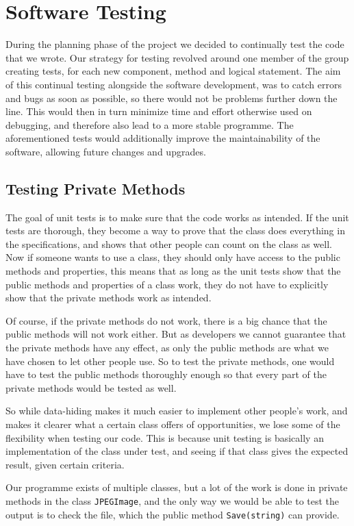 \section{Software Testing}
During the planning phase of the project we decided to continually test the code that we wrote.
Our strategy for testing revolved around one member of the group creating tests, for each new component, method and logical statement.
The aim of this continual testing alongside the software development, was to catch errors and bugs as soon as possible, so there would not be problems further down the line.
This would then in turn minimize time and effort otherwise used on debugging, and therefore also lead to a more stable programme.
The aforementioned tests would additionally improve the maintainability of the software, allowing future changes and upgrades.

\subsection{Testing Private Methods}
The goal of unit tests is to make sure that the code works as intended.
If the unit tests are thorough, they become a way to prove that the class does everything in the specifications, and shows that other people can count on the class as well.
Now if someone wants to use a class, they should only have access to the public methods and properties, this means that as long as the unit tests show that the public methods and properties of a class work, they do not have to explicitly show that the private methods work as intended.

Of course, if the private methods do not work, there is a big chance that the public methods will not work either.
But as developers we cannot guarantee that the private methods have any effect, as only the public methods are what we have chosen to let other people use. 
So to test the private methods, one would have to test the public methods thoroughly enough so that every part of the private methods would be tested as well. 

So while data-hiding makes it much easier to implement other people's work, and makes it clearer what a certain class offers of opportunities, we lose some of the flexibility when testing our code. This is because unit testing is basically an implementation of the class under test, and seeing if that class gives the expected result, given certain criteria. 

Our programme exists of multiple classes, but a lot of the work is done in private methods in the class \lstinline|JPEGImage|, and the only way we would be able to test the output is to check the file, which the public method \lstinline|Save(string)| can provide.

